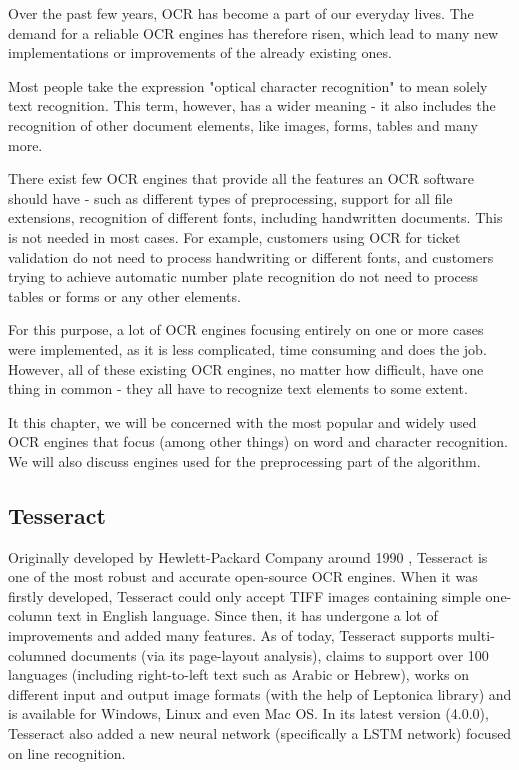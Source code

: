 Over the past few years, OCR has become a part of our everyday lives. The demand for a reliable OCR engines has therefore risen, which lead to many new implementations or improvements of the already existing ones.

Most people take the expression "optical character recognition" to mean solely text recognition. This term, however, has a wider meaning - it also includes the recognition of other document elements, like images, forms, tables and many more.

There exist few OCR engines that provide all the features an OCR software should have - such as different types of preprocessing, support for all file extensions, recognition of different fonts, including handwritten documents. This is not needed in most cases. For example, customers using OCR for ticket validation do not need to process handwriting or different fonts, and customers trying to achieve automatic number plate recognition do not need to process tables or forms or any other elements.

For this purpose, a lot of OCR engines focusing entirely on one or more cases were implemented, as it is less complicated, time consuming and does the job. However, all of these existing OCR engines, no matter how difficult, have one thing in common - they all have to recognize text elements to some extent.

It this chapter, we will be concerned with the most popular and widely used OCR engines that focus (among other things) on word and character recognition. We will also discuss engines used for the preprocessing part of the algorithm.

\subsection{Tesseract}

Originally developed by Hewlett-Packard Company around 1990 \citep{TesseractGIT}, Tesseract is one of the most robust and accurate open-source OCR engines. When it was firstly developed, Tesseract could only accept TIFF images containing simple one-column text in English language. Since then, it has undergone a lot of improvements and added many features. As of today, Tesseract supports multi-columned documents (via its page-layout analysis), claims to support over 100 languages (including right-to-left text such as Arabic or Hebrew), works on different input and output image formats (with the help of Leptonica \citep{LeptonicaLIB} library) and is available for Windows, Linux and even Mac OS. In its latest version (4.0.0), Tesseract also added a new neural network (specifically a LSTM network) focused on line recognition. 

